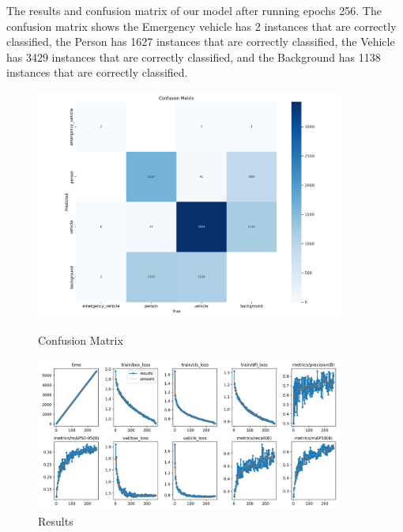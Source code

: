 \documentclass[usenatbib]{tjaa}
\begin{document}
The results and confusion matrix of our model after running epochs 256. The confusion matrix shows the Emergency vehicle has 2 instances that are correctly classified, the Person has 1627 instances that are correctly classified, the Vehicle has 3429 instances that are correctly classified, and the Background has 1138 instances that are correctly classified.


\begin{figure}
    \centering
    \begin{minipage}{0.5\textwidth}
        \centering
        \includegraphics[width=0.9\textwidth]{12.jpeg}
        \caption{Confusion Matrix}
        \label{fig:f6}
    \end{minipage}%
    \hfill %
    \begin{minipage}{0.5\textwidth}
        \centering
        \includegraphics[width=0.9\textwidth]{13.png}
        \caption{Results}
        \label{fig:f7}
    \end{minipage}
\end{figure}
\end{document}
